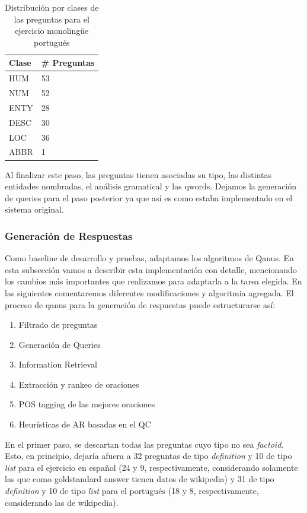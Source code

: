 \begin{table}
\centering
\begin{center}
\begin{tabular}{| l | l | }
\hline
Clase & \# Preguntas  \\ \hline
HUM &  53\\ \hline
NUM &  52\\ \hline
ENTY &  28\\ \hline
DESC &  30\\ \hline
LOC &  36\\ \hline
ABBR &  1\\ \hline
\end{tabular}
\caption{Distribución por clases de las preguntas para el ejercicio monolingüe portugués}
\label{table:qc-pt}
\end{center}
\end{table}

Al finalizar este paso, las preguntas tienen asociadas su tipo, las distintas entidades nombradas, el análisis gramatical y las qwords. Dejamos la generación de queries para el paso posterior ya que así es como estaba implementado en el sistema original.

\subsubsection{Generación de Respuestas}

Como baseline de desarrollo y pruebas, adaptamos los algoritmos de Qanus. En esta subsección vamos a describir esta implementación con detalle, mencionando los cambios más importantes que realizamos para adaptarla a la tarea elegida. En las siguientes comentaremos diferentes modificaciones y algoritmia agregada. El proceso de qanus para la generación de respuestas puede estructurarse así:
\begin{enumerate}
  \item Filtrado de preguntas
  \item Generación de Queries
  \item Information Retrieval
  \item Extracción y rankeo de oraciones
  \item POS tagging de las mejores oraciones
  \item Heurísticas de AR basadas en el QC
\end{enumerate}

En el primer paso, se descartan todas las preguntas cuyo tipo no sea \textit{factoid}. Esto, en principio, dejaría afuera a 32 preguntas de tipo \textit{definition} y 10 de tipo \textit{list} para el ejercicio en español (24 y 9, respectivamente, considerando solamente las que como goldstandard answer tienen datos de wikipedia) y 31 de tipo \textit{definition} y 10 de tipo \textit{list} para el portugués (18 y 8, respectivamente, considerando las de wikipedia).

